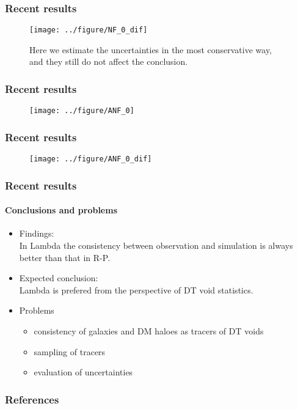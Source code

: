 \documentclass{beamer}
\newtheorem{Narrow down the analysis}{Narrow down the analysis}
\begin{document}
\begin{frame}
	\frametitle{Recent results}
\begin{figure}
\centering
\texttt{[image: ../figure/NF\_0\_dif]}
\caption{Here we estimate the uncertainties in the most conservative way, and they still do not affect the conclusion.}
\label{ex3}
\end{figure}
\end{frame}

\begin{frame}
	\frametitle{Recent results}
\begin{figure}
\centering
\texttt{[image: ../figure/ANF\_0]}
\label{ex4}
\end{figure}
\end{frame}

\begin{frame}
	\frametitle{Recent results}
\begin{figure}
\centering
\texttt{[image: ../figure/ANF\_0\_dif]}
\label{ex5}
\end{figure}
\end{frame}

\begin{frame}
\frametitle{Recent results}
\framesubtitle{Conclusions and problems}
\begin{itemize}
	\pause \item Findings: \\
	In Lambda the consistency between observation and simulation is always better than that in R-P.
	\pause \item Expected conclusion: \\
	Lambda is prefered from the perspective of DT void statistics.
	\pause \item Problems
	\begin{itemize}
	\item consistency of galaxies and DM haloes as tracers of DT voids
	\item sampling of tracers
	\item evaluation of uncertainties
	\end{itemize}	 
\end{itemize}
\end{frame}

\begin{frame}
\frametitle{References}

  
\end{frame}
\end{document}

